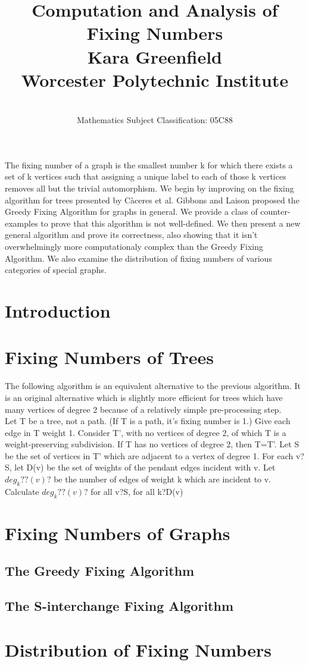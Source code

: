 \documentclass[12pt]{article}
\date{\dateline{Jan 4, 2007}{Feb 10, 2007}\\
   \small Mathematics Subject Classification: 05C88}
\begin{document}
\title{Computation and Analysis of Fixing Numbers \\ \vspace{5cm} \large{Kara Greenfield}\\\vspace{3mm} Worcester Polytechnic Institute } 

\maketitle
\vspace{2cm}
\newpage
\abstract
The fixing number of a graph is the smallest number k for which there exists a set of k vertices such that assigning a unique label to each of those k vertices removes all but the trivial automorphism.  We begin by improving on the fixing algorithm for trees presented by C\`aceres et al.  Gibbons and Laison proposed the Greedy Fixing Algorithm for graphs in general. We provide a class of counter-examples to prove that this algorithm is not well-defined. We then present a new general algorithm and prove its correctness, also showing that it isn't overwhelmingly more computationaly complex than the Greedy Fixing Algorithm. We also examine the distribution of fixing numbers of various categories of special graphs. 
\
\section{Introduction}

\section{Fixing Numbers of Trees}

The following algorithm is an equivalent alternative to the previous algorithm.  It is an original alternative which is slightly more efficient for trees which have many vertices of degree 2 because of a relatively simple pre-processing step. \\
Let T be a tree, not a path.  (If T is a path, it's fixing number is 1.)  
Give each edge in T weight 1.
Consider T', with no vertices of degree 2, of which T is a weight-preserving subdivision.  
    If T has no vertices of degree 2, then T=T'.
Let S be the set of vertices in T' which are adjacent to a vertex of degree 1.
For each v?S, let D(v) be the set of weights of the pendant edges incident with v.
              Let $deg_k??(v)?$ be the number of edges of weight k which are incident to v.
Calculate $deg_k??(v)?$ for all v?S, for all k?D(v)



\section{Fixing Numbers of Graphs}

\subsection{The Greedy Fixing Algorithm}

\subsection{The S-interchange Fixing Algorithm}

\section{Distribution of Fixing Numbers}
	
\end{document}

